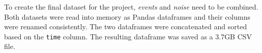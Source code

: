 
To create the final dataset for the project, \emph{events} and \emph{noise}
need to be combined. Both datasets were read into memory as Pandas dataframes
and their columns were renamed consistently. The two dataframes were
concatenated and sorted based on the \texttt{time} column. The resulting
dataframe was saved as a 3.7GB CSV file.


